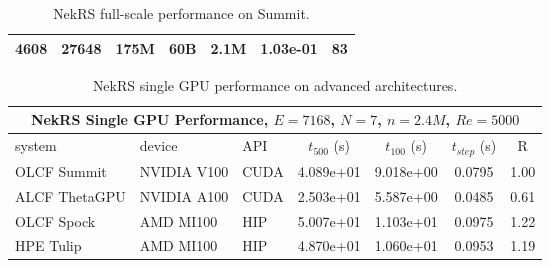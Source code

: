 \begin{table}[!t]
\begin{center}
\begin{tabular}{|c|c|c|c|c|c|r|}
 4608 & 27648 & 175M      & 60B   &  2.1M  & 1.03e-01  & 83    \\%
 \hline
 \end{tabular}
\end{center}
 \caption{\label{rod-strong-weak} NekRS full-scale performance on Summit.}
\end{table}


 \begin{table}[!t]
  \footnotesize
  \begin{center}
  \begin{tabular}{|l|l|l|c|c|c|c|}
  \hline
  \multicolumn{7}{|c|}{{\bf NekRS Single GPU Performance, $E=7168$, $N=7$, $n=2.4M$, $Re=5000$}} \\
  \hline
   system   & device &   API &  $t_{500}$ (s)    &   $t_{100}$  (s)  &   $t_{step}$ (s) & R \\
  \hline
    OLCF Summit   & NVIDIA V100  &  CUDA   &    4.089e+01  &  9.018e+00 &  0.0795 & 1.00   \\
    ALCF ThetaGPU & NVIDIA A100  &  CUDA   &    2.503e+01  &  5.587e+00 &  0.0485 & 0.61   \\
    OLCF Spock    & AMD MI100    &  HIP    &    5.007e+01  &  1.103e+01 &  0.0975 & 1.22   \\
    HPE Tulip     & AMD MI100    &  HIP    &    4.870e+01  &  1.060e+01 &  0.0953 & 1.19   \\
  \hline
  \end{tabular}
  \end{center}
  \caption{\label{singlerod} NekRS single GPU performance on advanced architectures.}
 \end{table}


